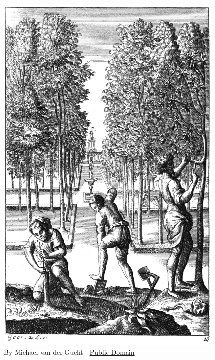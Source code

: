 \documentclass{beamer}
\begin{document}
\begin{frame}{}
\begin{columns}
\begin{column}{0.4\textwidth}
\begin{figure}
	\includegraphics[scale=0.18]{book2}
	\caption{By Michael van der Gucht - \href{https://commons.wikimedia.org/w/index.php?curid=88226096}{Public Domain}}
      \end{figure}
    \end{column}
  \end{columns}
\end{frame}
\end{document}
